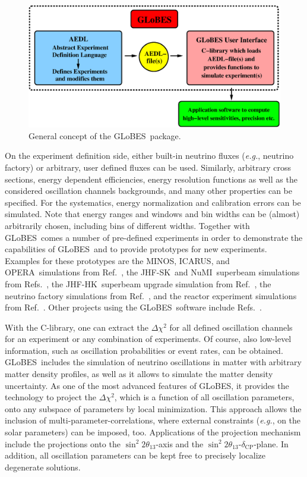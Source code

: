 \documentclass[12pt,a4paper]{article}
\newcommand{\eg}{{\it e.g.}}
\newcommand{\Ref}{Ref.}
\newcommand{\Refs}{Refs.}
\newcommand{\deltacp}{\delta_{\mathrm{CP}}}
\newcommand{\stheta}{\sin^2 2 \theta_{13}}
\newcommand{\MINOS}{{\sf MINOS}}
\newcommand{\ICARUS}{{\sf ICARUS}}
\newcommand{\OPERA}{{\sf OPERA}}
\newcommand{\JHFSK}{{\sf JHF-SK}}
\newcommand{\NUMI }{{\sf NuMI}}
\newcommand{\JHFHK}{{\sf JHF-HK}}
\newcommand{\GLOBES}{{\sf GLoBES}}
\begin{document}
\begin{figure}[t]
\begin{center}
\includegraphics[width=16cm]{GLOBES}
\end{center}
\caption{\label{fig:GLOBES} General concept of the \GLOBES\ package.}
\end{figure}

On the experiment definition side, either built-in neutrino fluxes
(\eg, neutrino factory) or arbitrary, user defined fluxes can be used. 
Similarly,
arbitrary cross sections, energy dependent efficiencies,
energy resolution functions as well as the considered oscillation channels 
backgrounds, and many other properties can be specified. 
For the systematics, energy
normalization and calibration errors can be simulated. Note that
energy ranges and windows and bin widths can be
(almost) arbitrarily chosen, including bins of different
widths. Together with \GLOBES\ comes a number of
pre-defined experiments in order to demonstrate the capabilities
of \GLOBES\ and to provide prototypes for new experiments.
Examples for these prototypes are the \MINOS , \ICARUS , and
\OPERA\ simulations from \Ref~\cite{Huber:2004ug}, the
\JHFSK\ and \NUMI\ superbeam simulations from \Refs~\cite{Huber:2002mx,
Huber:2002rs}, the \JHFHK\ superbeam upgrade simulation from
\Ref~\cite{Huber:2002mx}, the neutrino factory simulations from
\Ref~\cite{Huber:2002mx}, and the reactor experiment simulations from
\Ref~\cite{Huber:2003pm}. Other projects using the \GLOBES\ 
software include \Refs~\cite{Huber:2003ak,Ohlsson:2003ip,Winter:2003ye,Antusch:2004yx}.

With the C-library, one can extract the $\Delta \chi^2$ for all defined 
oscillation channels for an experiment or any combination of experiments.
Of course, also low-level information, such as oscillation
probabilities or event rates, can be obtained. \GLOBES\ includes the
simulation of neutrino oscillations in matter with arbitrary matter 
density profiles, as well as it allows to simulate the matter density
uncertainty. As one of the most
advanced features of \GLOBES , it provides the technology to 
project the $\Delta \chi^2$, which is a function of all oscillation
parameters, onto any subspace of parameters by local minimization. 
This approach allows the inclusion of multi-parameter-correlations,
where external constraints (\eg, on the solar parameters) can be imposed, too.
Applications of the projection mechanism include the projections onto 
the $\stheta$-axis and the $\stheta$-$\deltacp$-plane. In addition, 
all oscillation parameters can be kept free to precisely localize 
degenerate solutions.
\end{document}
